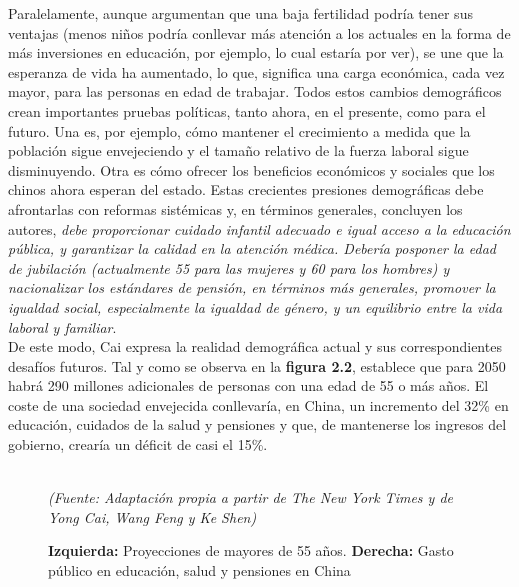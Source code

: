 Paralelamente, aunque argumentan que una baja fertilidad podría tener sus ventajas (menos niños podría conllevar más atención a los actuales en la forma de más inversiones en educación, por ejemplo, lo cual estaría por ver), se une que la esperanza de vida ha aumentado, lo que, significa una carga económica, cada vez mayor, para las personas en edad de trabajar. Todos estos cambios demográficos crean importantes pruebas políticas, tanto ahora, en el presente, como para el futuro. Una es, por ejemplo, cómo mantener el crecimiento a medida que la población sigue envejeciendo y el tamaño relativo de la fuerza laboral sigue disminuyendo. Otra es cómo ofrecer los beneficios económicos y sociales que los chinos ahora esperan del estado. Estas crecientes presiones demográficas debe afrontarlas con reformas sistémicas y, en términos generales, concluyen los autores, \textit{debe proporcionar cuidado infantil adecuado e igual acceso a la educación pública, y garantizar la calidad en la atención médica. Debería posponer la edad de jubilación (actualmente 55 para las mujeres y 60 para los hombres) y nacionalizar los estándares de pensión, en términos más generales, promover la igualdad social, especialmente la igualdad de género, y un equilibrio entre la vida laboral y familiar}.\\

De este modo, Cai expresa la realidad demográfica actual y sus correspondientes desafíos futuros. Tal y como se observa en la \textbf{figura 2.2}, establece que para 2050 habrá 290 millones adicionales de personas con una edad de 55 o más años. El coste de una sociedad envejecida conllevaría, en China, un incremento del 32\% en educación, cuidados de la salud y pensiones y que, de mantenerse los ingresos del gobierno, crearía un déficit de casi el 15\%.\\

\begin{figure}[!ht]
\centering
\hspace*{-0.6cm}
\captionsetup{width=1.2\linewidth}
\caption[Proyecciones de población y gasto público en China]{\textbf{Izquierda:} Proyecciones de mayores de 55 años. \textbf{Derecha:} Gasto público en educación, salud y pensiones en China}\\
\textit{(Fuente: Adaptación propia a partir de The New York Times y de Yong Cai, Wang Feng y Ke Shen)}
\end{figure}

